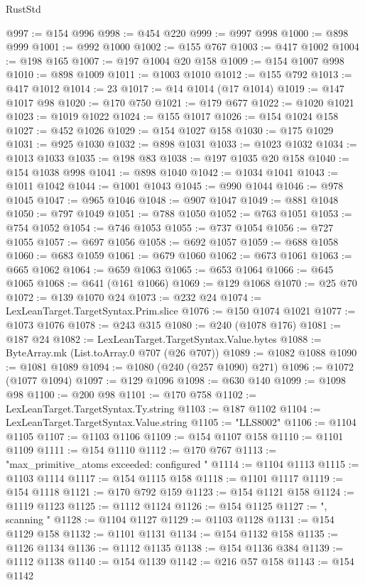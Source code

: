 \begin{lexlean}{RustStd}
\begin{coremodule}
@997 := @154 @996
@998 := @454 @220
@999 := @997 @998
@1000 := @898 @999
@1001 := @992 @1000
@1002 := @155 @767
@1003 := @417 @1002
@1004 := @198 @165
@1007 := @197 @1004 @20 @158
@1009 := @154 @1007 @998
@1010 := @898 @1009
@1011 := @1003 @1010
@1012 := @155 @792
@1013 := @417 @1012
@1014 := 23
@1017 := @14 @1014 (@17 @1014)
@1019 := @147 @1017 @98
@1020 := @170 @750
@1021 := @179 @677
@1022 := @1020 @1021
@1023 := @1019 @1022
@1024 := @155 @1017
@1026 := @154 @1024 @158
@1027 := @452 @1026
@1029 := @154 @1027 @158
@1030 := @175 @1029
@1031 := @925 @1030
@1032 := @898 @1031
@1033 := @1023 @1032
@1034 := @1013 @1033
@1035 := @198 @83
@1038 := @197 @1035 @20 @158
@1040 := @154 @1038 @998
@1041 := @898 @1040
@1042 := @1034 @1041
@1043 := @1011 @1042
@1044 := @1001 @1043
@1045 := @990 @1044
@1046 := @978 @1045
@1047 := @965 @1046
@1048 := @907 @1047
@1049 := @881 @1048
@1050 := @797 @1049
@1051 := @788 @1050
@1052 := @763 @1051
@1053 := @754 @1052
@1054 := @746 @1053
@1055 := @737 @1054
@1056 := @727 @1055
@1057 := @697 @1056
@1058 := @692 @1057
@1059 := @688 @1058
@1060 := @683 @1059
@1061 := @679 @1060
@1062 := @673 @1061
@1063 := @665 @1062
@1064 := @659 @1063
@1065 := @653 @1064
@1066 := @645 @1065
@1068 := @641 (@161 @1066)
@1069 := @129 @1068
@1070 := @25 @70
@1072 := @139 @1070 @24
@1073 := @232 @24
@1074 := LexLeanTarget.TargetSyntax.Prim.slice
@1076 := @150 @1074 @1021
@1077 := @1073 @1076
@1078 := @243 @315
@1080 := @240 (@1078 @176)
@1081 := @187 @24
@1082 := LexLeanTarget.TargetSyntax.Value.bytes
@1088 := ByteArray.mk (List.toArray.{0} @707 (@26 @707))
@1089 := @1082 @1088
@1090 := @1081 @1089
@1094 := @1080 (@240 (@257 @1090) @271)
@1096 := @1072 (@1077 @1094)
@1097 := @129 @1096
@1098 := @630 @140
@1099 := @1098 @98
@1100 := @200 @98
@1101 := @170 @758
@1102 := LexLeanTarget.TargetSyntax.Ty.string
@1103 := @187 @1102
@1104 := LexLeanTarget.TargetSyntax.Value.string
@1105 := "LLS8002"
@1106 := @1104 @1105
@1107 := @1103 @1106
@1109 := @154 @1107 @158
@1110 := @1101 @1109
@1111 := @154 @1110
@1112 := @170 @767
@1113 := "max_primitive_atoms exceeded: configured "
@1114 := @1104 @1113
@1115 := @1103 @1114
@1117 := @154 @1115 @158
@1118 := @1101 @1117
@1119 := @154 @1118
@1121 := @170 @792 @159
@1123 := @154 @1121 @158
@1124 := @1119 @1123
@1125 := @1112 @1124
@1126 := @154 @1125
@1127 := ", scanning "
@1128 := @1104 @1127
@1129 := @1103 @1128
@1131 := @154 @1129 @158
@1132 := @1101 @1131
@1134 := @154 @1132 @158
@1135 := @1126 @1134
@1136 := @1112 @1135
@1138 := @154 @1136 @384
@1139 := @1112 @1138
@1140 := @154 @1139
@1142 := @216 @57 @158
@1143 := @154 @1142

\end{coremodule}
\end{lexlean}
